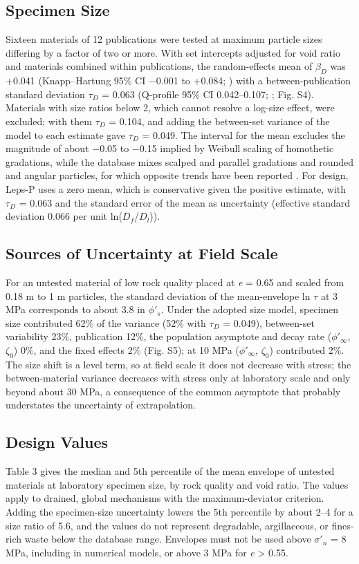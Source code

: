 \documentclass[Journal,letterpaper]{ascelike-new}
\begin{document}
\subsection{Specimen Size}
Sixteen materials of 12 publications were tested at maximum particle sizes differing by a factor of two or more. With set intercepts adjusted for void ratio and materials combined within publications, the random-effects mean of $\beta_D$ was +0.041 (Knapp--Hartung 95\% CI $-$0.001 to +0.084; ) with a between-publication standard deviation $\tau_D$ = 0.063 (Q-profile 95\% CI 0.042--0.107; ; Fig. S4). Materials with size ratios below 2, which cannot resolve a log-size effect, were excluded; with them $\tau_D$ = 0.104, and adding the between-set variance of the model to each estimate gave $\tau_D$ = 0.049. The interval for the mean excludes the magnitude of about $-$0.05 to $-$0.15 implied by Weibull scaling of homothetic gradations, while the database mixes scalped and parallel gradations and rounded and angular particles, for which opposite trends have been reported \cite{varadarajan2003}. For design, Leps-P uses a zero mean, which is conservative given the positive estimate, with $\tau_D$ = 0.063 and the standard error of the mean as uncertainty (effective standard deviation 0.066 per unit ln($D_f$/$D_l$)).

\subsection{Sources of Uncertainty at Field Scale}
For an untested material of low rock quality placed at \textit{e} = 0.65 and scaled from 0.18 m to 1 m particles, the standard deviation of the mean-envelope ln $\tau$ at 3 MPa corresponds to about 3.8\textdegree{} in $\phi'_s$. Under the adopted size model, specimen size contributed 62\% of the variance (52\% with $\tau_D$ = 0.049), between-set variability 23\%, publication 12\%, the population asymptote and decay rate ($\phi'_\infty$, $\zeta_0$) 0\%, and the fixed effects 2\% (Fig. S5); at 10 MPa ($\phi'_\infty$, $\zeta_0$) contributed 2\%. The size shift is a level term, so at field scale it does not decrease with stress; the between-material variance decreases with stress only at laboratory scale and only beyond about 30 MPa, a consequence of the common asymptote that probably understates the uncertainty of extrapolation.

\subsection{Design Values}
Table 3 gives the median and 5th percentile of the mean envelope of untested materials at laboratory specimen size, by rock quality and void ratio. The values apply to drained, global mechanisms with the maximum-deviator criterion. Adding the specimen-size uncertainty lowers the 5th percentile by about 2--4\textdegree{} for a size ratio of 5.6, and the values do not represent degradable, argillaceous, or fines-rich waste below the database range. Envelopes must not be used above $\sigma'_n$ = 8 MPa, including in numerical models, or above 3 MPa for \textit{e} > 0.55.
\end{document}
